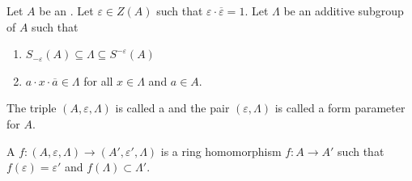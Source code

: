 \begin{definition} \label{definition:unitary_ring}
    Let $A$ be an . Let $\varepsilon \in Z(A)$ such that $\varepsilon \cdot \overline{\varepsilon} = 1$. Let $\Lambda$ be an additive subgroup of $A$ such that 

    \begin{enumerate}
        \item $S_{-\varepsilon}(A) \subseteq \Lambda \subseteq S^{-\varepsilon}(A)$

        \item $a \cdot x \cdot \overline{a} \in \Lambda$ for all $x \in \Lambda$ and $a \in A$. 
    \end{enumerate}
    The triple $(A, \varepsilon, \Lambda)$ is called a  and the pair $(\varepsilon, \Lambda)$ is called a form parameter for $A$. 

    A  $f: (A,\varepsilon, \Lambda) \to (A' ,\varepsilon', \Lambda)$ is a ring homomorphism $f: A \to A'$ such that $f(\varepsilon) = \varepsilon'$ and $f(\Lambda) \subset \Lambda'$. 
\end{definition}